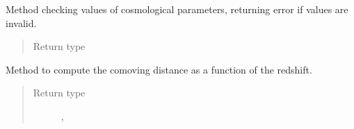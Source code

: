 \documentclass[letterpaper,10pt,english]{sphinxmanual}
\begin{document}
\begin{fulllineitems}
\begin{fulllineitems}
\label{\detokenize{api/seyfert.cosmology.cosmology.Cosmology:seyfert.cosmology.cosmology.Cosmology.checkParameters}}
\sphinxAtStartPar
Method checking values of cosmological parameters, returning error if values are invalid.
\begin{quote}\begin{description}
\item[{Return type}] \leavevmode
\sphinxAtStartPar
{}

\end{description}\end{quote}

\end{fulllineitems}


\begin{fulllineitems}
\label{\detokenize{api/seyfert.cosmology.cosmology.Cosmology:seyfert.cosmology.cosmology.Cosmology.computeComovingDistance}}
\sphinxAtStartPar
Method to compute the comoving distance as a function of the redshift.
\begin{quote}\begin{description}
\item[{Return type}] \leavevmode
\sphinxAtStartPar
\sphinxcode{\sphinxupquote{Union}}{[}, \sphinxcode{\sphinxupquote{ndarray}}{]}

\end{description}\end{quote}

\end{fulllineitems}



\end{fulllineitems}
\end{document}
